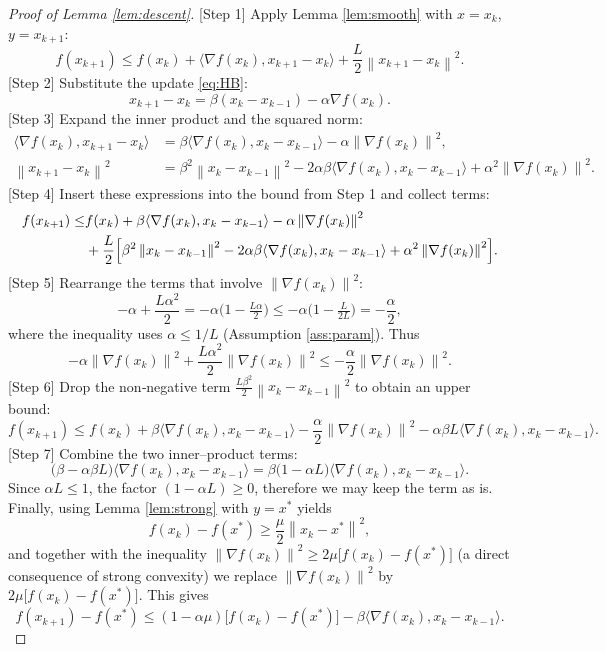 \documentclass{article}
\newcommand{\norm}[1]{\left\lVert #1\right\rVert}
\newcommand{\ip}[2]{\langle #1,#2\rangle}
\newcommand{\grad}{\nabla}
\begin{document}
\begin{proof}[Proof of Lemma \ref{lem:descent}]
[Step 1] Apply Lemma \ref{lem:smooth} with $x=x_{k}$, $y=x_{k+1}$:
\[
f(x_{k+1})\le f(x_{k})+\ip{\grad f(x_{k})}{x_{k+1}-x_{k}}+\frac{L}{2}\norm{x_{k+1}-x_{k}}^{2}.
\]
[Step 2] Substitute the update \eqref{eq:HB}:
\[
x_{k+1}-x_{k}= \beta(x_{k}-x_{k-1})-\alpha\grad f(x_{k}).
\]
[Step 3] Expand the inner product and the squared norm:
\[
\begin{aligned}
\ip{\grad f(x_{k})}{x_{k+1}-x_{k}}
&= \beta\ip{\grad f(x_{k})}{x_{k}-x_{k-1}}-\alpha\norm{\grad f(x_{k})}^{2},\\[4pt]
\norm{x_{k+1}-x_{k}}^{2}
&= \beta^{2}\norm{x_{k}-x_{k-1}}^{2}
-2\alpha\beta\ip{\grad f(x_{k})}{x_{k}-x_{k-1}}
+\alpha^{2}\norm{\grad f(x_{k})}^{2}.
\end{aligned}
\]
[Step 4] Insert these expressions into the bound from Step 1 and collect terms:
\[
\begin{aligned}
f(x_{k+1})\le
& f(x_{k})
+\beta\ip{\grad f(x_{k})}{x_{k}-x_{k-1}}
-\alpha\norm{\grad f(x_{k})}^{2}\\
&+\frac{L}{2}\Bigl[\beta^{2}\norm{x_{k}-x_{k-1}}^{2}
-2\alpha\beta\ip{\grad f(x_{k})}{x_{k}-x_{k-1}}
+\alpha^{2}\norm{\grad f(x_{k})}^{2}\Bigr].
\end{aligned}
\]
[Step 5] Rearrange the terms that involve $\norm{\grad f(x_{k})}^{2}$:
\[
-\alpha+\frac{L\alpha^{2}}{2}
= -\alpha\bigl(1-\tfrac{L\alpha}{2}\bigr)
\le -\alpha\bigl(1-\tfrac{L}{2L}\bigr) = -\frac{\alpha}{2},
\]
where the inequality uses $\alpha\le 1/L$ (Assumption \ref{ass:param}).  
Thus
\[
-\alpha\norm{\grad f(x_{k})}^{2}+\frac{L\alpha^{2}}{2}\norm{\grad f(x_{k})}^{2}
\le -\frac{\alpha}{2}\norm{\grad f(x_{k})}^{2}.
\]
[Step 6] Drop the non‑negative term $\frac{L\beta^{2}}{2}\norm{x_{k}-x_{k-1}}^{2}$ to obtain an upper bound:
\[
f(x_{k+1})\le f(x_{k})
+\beta\ip{\grad f(x_{k})}{x_{k}-x_{k-1}}
-\frac{\alpha}{2}\norm{\grad f(x_{k})}^{2}
-\alpha\beta L\ip{\grad f(x_{k})}{x_{k}-x_{k-1}}.
\]
[Step 7] Combine the two inner–product terms:
\[
\bigl(\beta-\alpha\beta L\bigr)\ip{\grad f(x_{k})}{x_{k}-x_{k-1}}
= \beta\bigl(1-\alpha L\bigr)\ip{\grad f(x_{k})}{x_{k}-x_{k-1}}.
\]
Since $\alpha L\le1$, the factor $(1-\alpha L)\ge0$, therefore we may keep the term as is.  
Finally, using Lemma \ref{lem:strong} with $y=x^{*}$ yields
\[
f(x_{k})-f(x^{*})\ge \frac{\mu}{2}\norm{x_{k}-x^{*}}^{2},
\]
and together with the inequality $\norm{\grad f(x_{k})}^{2}\ge 2\mu\bigl[f(x_{k})-f(x^{*})\bigr]$ (a direct consequence of strong convexity) we replace $\norm{\grad f(x_{k})}^{2}$ by $2\mu\bigl[f(x_{k})-f(x^{*})\bigr]$. This gives
\[
f(x_{k+1})-f(x^{*})\le (1-\alpha\mu)\bigl[f(x_{k})-f(x^{*})\bigr]
-\beta\ip{\grad f(x_{k})}{x_{k}-x_{k-1}}.
\]
\end{proof}
\end{document}
